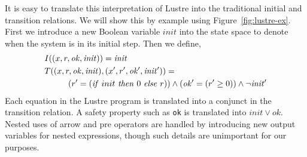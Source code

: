 It is easy to translate this interpretation of Lustre into the
traditional initial and transition relations. We will show this by
example using Figure~\ref{fig:lustre-ex}. First we introduce a new Boolean
variable $init$ into the state space to denote when the system is in
its initial step. Then we define,
\begin{align*}
  &I((x, r, \mathit{ok}, \mathit{init})) = \mathit{init} \\
  &T((x, r, \mathit{ok}, \mathit{init}), (x', r', \mathit{ok'},
  \mathit{init'})) = \\
  &\hspace{1cm} (r' = (\mathit{if}\ init\ \mathit{then}\ 0\ \mathit{else}\ r)) \land (\mathit{ok'} =
  (r' \geq 0)) \land \neg\mathit{init'}
\end{align*}
Each equation in the Lustre program is translated into a conjunct in
the transition relation. A safety property such as {\tt ok} is
translated into $\mathit{init} \lor \mathit{ok}$. Nested uses of arrow
and pre operators are handled by introducing new output variables for
nested expressions, though such details are unimportant for our
purposes.




